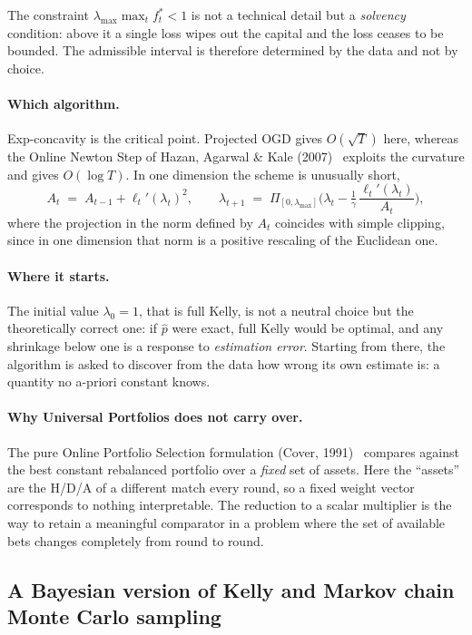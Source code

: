 \documentclass[12pt,a4paper,oneside]{report}
\renewcommand{\_}{\oldunderscore\allowbreak}
\theoremstyle{definition}
\theoremstyle{plain}
\theoremstyle{definition}   %
\begin{document}
The constraint $\lambda_{\max}\max_t f^{*}_t < 1$ is not a technical detail but a
\emph{solvency} condition: above it a single loss wipes out the capital and the loss ceases to be
bounded. The admissible interval is therefore determined by the data and not by choice.

\paragraph{Which algorithm.} Exp-concavity is the critical point. Projected OGD gives $O(\sqrt{T})$
here, whereas the Online Newton Step of Hazan, Agarwal \& Kale (2007)~\cite{hazan2007} exploits the curvature and
gives $O(\log T)$. In one dimension the scheme is unusually short,
\[
A_t \;=\; A_{t-1} + \ell_t'(\lambda_t)^2, \qquad
\lambda_{t+1} \;=\; \Pi_{[0,\lambda_{\max}]}\Big(\lambda_t - \tfrac{1}{\gamma}\,
\frac{\ell_t'(\lambda_t)}{A_t}\Big),
\]
where the projection in the norm defined by $A_t$ coincides with simple clipping, since in one
dimension that norm is a positive rescaling of the Euclidean one.

\paragraph{Where it starts.} The initial value $\lambda_0 = 1$, that is full Kelly, is not a
neutral choice but the theoretically correct one: if $\hat{p}$ were exact, full Kelly would be
optimal, and any shrinkage below one is a response to \emph{estimation error}. Starting from
there, the algorithm is asked to discover from the data how wrong its own estimate is: a
quantity no a-priori constant knows.

\paragraph{Why Universal Portfolios does not carry over.} The pure Online Portfolio Selection
formulation (Cover, 1991)~\cite{cover1991} compares against the best constant rebalanced portfolio over a
\emph{fixed} set of assets. Here the ``assets'' are the H/D/A of a different match every round,
so a fixed weight vector corresponds to nothing interpretable. The reduction to a scalar
multiplier is the way to retain a meaningful comparator in a problem where the set of available
bets changes completely from round to round.

\subsection{A Bayesian version of Kelly and Markov chain Monte Carlo sampling}
\label{sec:mcmc-theory}
\end{document}
